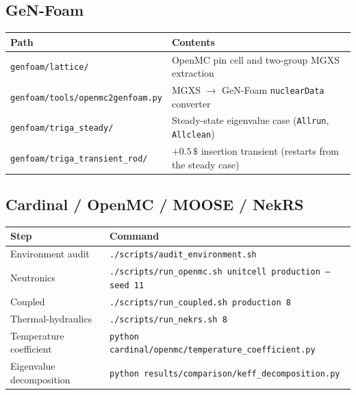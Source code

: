 \documentclass[11pt,a4paper]{article}
\begin{document}
\subsection{GeN-Foam}
\begin{table}[H]\centering\small
\begin{tabular}{@{}ll@{}}
\toprule
\textbf{Path} & \textbf{Contents}\\
\midrule
\texttt{genfoam/lattice/} & OpenMC pin cell and two-group MGXS extraction\\
\texttt{genfoam/tools/openmc2genfoam.py} & MGXS $\rightarrow$ GeN-Foam \texttt{nuclearData} converter\\
\texttt{genfoam/triga\_steady/} & Steady-state eigenvalue case (\texttt{Allrun}, \texttt{Allclean})\\
\texttt{genfoam/triga\_transient\_rod/} & $+0.5\,\$$ insertion transient (restarts from the steady case)\\
\bottomrule
\end{tabular}
\end{table}

\subsection{Cardinal / OpenMC / MOOSE / NekRS}
\begin{table}[H]\centering\small
\begin{tabular}{@{}ll@{}}
\toprule
\textbf{Step} & \textbf{Command}\\
\midrule
Environment audit & \texttt{./scripts/audit\_environment.sh}\\
Neutronics & \texttt{./scripts/run\_openmc.sh unitcell production --seed 11}\\
Coupled & \texttt{./scripts/run\_coupled.sh production 8}\\
Thermal-hydraulics & \texttt{./scripts/run\_nekrs.sh 8}\\
Temperature coefficient & \texttt{python cardinal/openmc/temperature\_coefficient.py}\\
Eigenvalue decomposition & \texttt{python results/comparison/keff\_decomposition.py}\\
\bottomrule
\end{tabular}
\end{table}
\end{document}
